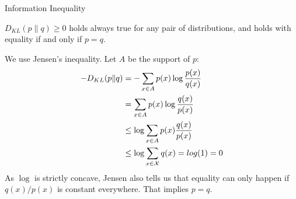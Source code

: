 \documentclass[11pt,compress,t,notes=noshow, xcolor=table]{beamer}
\begin{document}
\begin{vbframe} {Information Inequality}

$ D_{KL}(p \| q) \geq 0$ holds always true for any pair of distributions, and holds with equality if and only if $p=q$. 

\lz  

We use Jensen's inequality. Let $A$ be the support of $p$:
\begin{equation*}
    \begin{aligned} 
-D_{KL}(p \| q) &= -\sum_{x \in A} p(x) \log \frac{p(x)}{q(x)} \\
                &=  \sum_{x \in A} p(x) \log \frac{q(x)}{p(x)} \\
                &\leq \log \sum_{x \in A} p(x) \frac{q(x)}{p(x)} \\
                &\leq \log \sum_{x \in \mathcal{X}} q(x) = log(1) = 0 
    \end{aligned} 
  \end{equation*}
As $\log$ is strictly concave, Jensen also tells us that equality can only happen if $q(x)/p(x)$ is constant everywhere. That implies $p=q$.
\end{vbframe}
\end{document}

